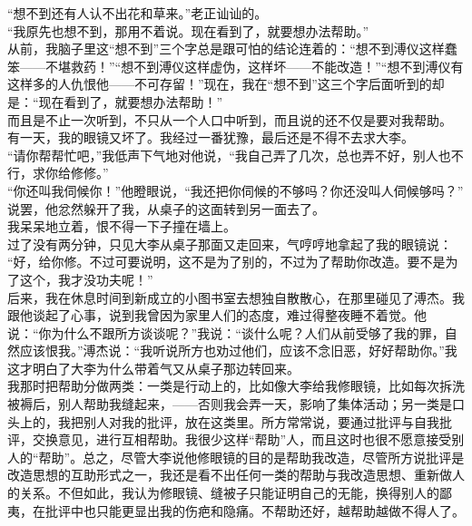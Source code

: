 “想不到还有人认不出花和草来。”老正讪讪的。\\

“我原先也想不到，那用不着说。现在看到了，就要想办法帮助。”\\

从前，我脑子里这“想不到”三个字总是跟可怕的结论连着的：“想不到溥仪这样蠢笨——不堪救药！”“想不到溥仪这样虚伪，这样坏——不能改造！”“想不到溥仪有这样多的人仇恨他——不可存留！”现在，我在“想不到”这三个字后面听到的却是：“现在看到了，就要想办法帮助！”\\

而且是不止一次听到，不只从一个人口中听到，而且说的还不仅是要对我帮助。\\

有一天，我的眼镜又坏了。我经过一番犹豫，最后还是不得不去求大李。\\

“请你帮帮忙吧，”我低声下气地对他说，“我自己弄了几次，总也弄不好，别人也不行，求你给修修。”\\

“你还叫我伺候你！”他瞪眼说，“我还把你伺候的不够吗？你还没叫人伺候够吗？”\\

说罢，他忿然躲开了我，从桌子的这面转到另一面去了。\\

我呆呆地立着，恨不得一下子撞在墙上。\\

过了没有两分钟，只见大李从桌子那面又走回来，气哼哼地拿起了我的眼镜说：\\

“好，给你修。不过可要说明，这不是为了别的，不过为了帮助你改造。要不是为了这个，我才没功夫呢！”\\

后来，我在休息时间到新成立的小图书室去想独自散散心，在那里碰见了溥杰。我跟他谈起了心事，说到我曾因为家里人们的态度，难过得整夜睡不着觉。他说：“你为什么不跟所方谈谈呢？”我说：“谈什么呢？人们从前受够了我的罪，自然应该恨我。”溥杰说：“我听说所方也劝过他们，应该不念旧恶，好好帮助你。”我这才明白了大李为什么带着气又从桌子那边转回来。\\

我那时把帮助分做两类：一类是行动上的，比如像大李给我修眼镜，比如每次拆洗被褥后，别人帮助我缝起来，——否则我会弄一天，影响了集体活动；另一类是口头上的，我把别人对我的批评，放在这类里。所方常常说，要通过批评与自我批评，交换意见，进行互相帮助。我很少这样“帮助”人，而且这时也很不愿意接受别人的“帮助”。总之，尽管大李说他修眼镜的目的是帮助我改造，尽管所方说批评是改造思想的互助形式之一，我还是看不出任何一类的帮助与我改造思想、重新做人的关系。不但如此，我认为修眼镜、缝被子只能证明自己的无能，换得别人的鄙夷，在批评中也只能更显出我的伤疤和隐痛。不帮助还好，越帮助越做不得人了。\\

